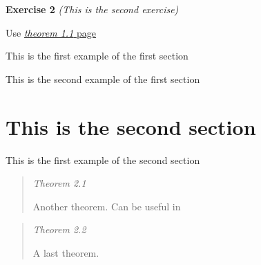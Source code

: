 \documentclass[]{article}
\providecommand{\tightlist}{%
  \setlength{\itemsep}{0pt}\setlength{\parskip}{0pt}}
\begin{document}
\protect\hypertarget{exercise:second}{}{\label{exercise:second}\textbf{Exercise
2} \emph{(This is the second exercise)}}

Use \protect\hyperlink{theorem:first}{\emph{theorem 1.1} page
\pageref{theorem:first}}

\begin{description}
\tightlist
\item[\phantomsection\addcontentsline{example}{example}{\protect\numberline {1.1}{\ignorespaces {Example}}}\protect\hypertarget{example:1.1}{}{\label{example:1.1}\textbf{Example
1}}]
This is the first example of the first section
\item[\phantomsection\addcontentsline{example}{example}{\protect\numberline {1.2}{\ignorespaces {Example}}}\protect\hypertarget{example:1.2}{}{\label{example:1.2}\textbf{Example
2}}]
This is the second example of the first section
\end{description}

\hypertarget{this-is-the-second-section}{%
\section{This is the second section}\label{this-is-the-second-section}}

\begin{description}
\tightlist
\item[\phantomsection\addcontentsline{example}{example}{\protect\numberline {2.1}{\ignorespaces {Example}}}\protect\hypertarget{example:2.1}{}{\label{example:2.1}\textbf{Example
1}}]
This is the first example of the second section
\end{description}

\begin{quote}
\protect\hypertarget{theorem:2.1}{}{\label{theorem:2.1}\emph{Theorem
2.1}}

Another theorem. Can be useful in \protect\hyperlink{exercise:1}{}
\end{quote}

\begin{quote}
\protect\hypertarget{theorem:2.2}{}{\label{theorem:2.2}\emph{Theorem
2.2}}

A last theorem.
\end{quote}
\end{document}
